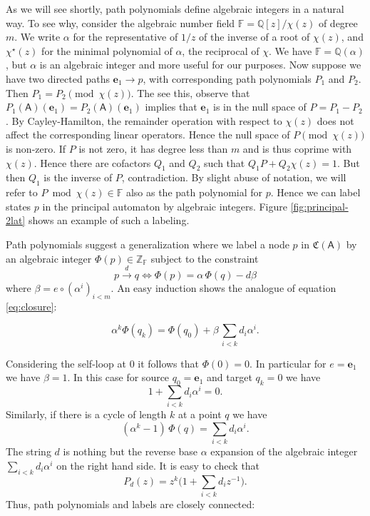 \documentclass[12pt]{svmult}
\def\FF{\mathbb{F}}
\def\Q{\mathbb{Q}}
\def\Z{\mathbb{Z}}
\def\AA{\mathsf{A}}             %
\def\chis{\Star{\chi}}          %
\def\cmpaut{\fC}                %
\def\fC{\mathfrak{C}}           %
\def\ppol#1#2{P^{#1}_{#2}}      %
\def\trans#1#2#3{{#1}\stackrel{{#2}}{\longrightarrow}{#3}}
\def\unvo{\mathbf{e}_{1}}
\providecommand{\Star}[1]{{#1}^{\star}}
\begin{document}
As we will see shortly, path polynomials define algebraic integers in a natural way. 
To see why, consider the algebraic number field  $\FF = \Q[z]/\chi(z)$ of degree $m$.  
We write $\alpha$ for the representative of $1/z$ of the inverse of a root of $\chi(z)$, 
and $\chis(z)$ for the minimal polynomial of $\alpha$, the reciprocal of $\chi$. 
We have $\FF = \Q(\alpha)$, but $\alpha$ is an algebraic integer and more 
useful for our purposes. 
Now suppose we have two directed paths $\unvo \longrightarrow p$, with corresponding 
path polynomials $P_1$ and $P_2$. 
Then $P_{1} = P_{2} \pmod{\chi(z)}$. 
The see this, observe that $P_{1}(\AA)(\unvo) = P_{2}(\AA)(\unvo)$ implies that 
$\unvo$ is in the null space of $P = P_{1} - P_{2}$. 
By Cayley-Hamilton, the remainder operation with respect to $\chi(z)$ 
does not affect the corresponding linear operators. 
Hence the null space of $P \pmod{\chi(z)}$ is non-zero. 
If $P$ is not zero, it has degree less than $m$ and is thus coprime with $\chi(z)$. 
Hence there are cofactors $Q_1$ and $Q_2$ such that $Q_{1}P + Q_{2}\chi(z) = 1$. 
But then $Q_1$ is the inverse of $P$, contradiction. 
By slight abuse of notation, we will refer to $P \bmod{\chi(z)} \in \FF$ also as 
the path polynomial for $p$. 
Hence we can label states $p$ in the principal automaton by algebraic integers. 
Figure \ref{fig:principal-2lat} shows an example of such a labeling. 

Path polynomials suggest a generalization where we label a node $p$ in $\cmpaut(\AA)$ 
by an algebraic integer $\Phi(p) \in \Z_{\FF}$ subject to the constraint 
%
\begin{equation}
\label{eq:labeling}
   \trans{p}{d}{q}  \iff  \Phi(p) = \alpha \, \Phi(q)  - d \beta 
\end{equation}
%
where $\beta = e \circ (\alpha^{i})_{i<m}$. 
An easy induction shows the analogue of equation \eqref{eq:closure}:

\begin{lemma}
\label{lem:path-label}
$$
    \alpha^{k} \Phi(q_{k}) = \Phi(q_{0}) + \beta \, \sum_{i<k} d_{i} \alpha^{i}.
$$
\end{lemma}

Considering the self-loop at $0$ it follows that $\Phi(0) = 0$. 
In particular for $e = \unvo$ we have $\beta = 1$. 
In this case for source $q_0 = \unvo$ and target $q_k = 0$ we have 
%
$$
    1 + \sum_{i<k} d_{i} \alpha^{i} = 0.
$$
%
Similarly, if there is a cycle of length $k$ at a point $q$ we have 
%
$$
    (\alpha^{k}-1) \, \Phi(q) = \sum_{i<k} d_{i} \alpha^{i}.
$$
% 
The string $d$ is nothing but the reverse base $\alpha$ expansion
of the algebraic integer $\sum_{i<k} d_{i} \alpha^{i}$ on the right hand side. 
It is easy to check that 
%
$$
     \ppol{}{d}(z) = z^{k} \biggl( 1 + \sum_{i<k} d_{i} z^{-1} \biggr).
$$
%
Thus, path polynomials and labels are closely connected:
\end{document}
